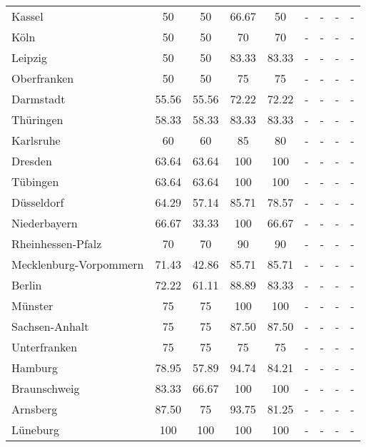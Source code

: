 \begin{table}[H]
\begin{tabularx}{\textwidth}{Xcccccccc}
            Kassel & 50 & 50 & 66.67 & 50 & - & - & - & - \\
            Köln & 50 & 50 & 70 & 70 & - & - & - & - \\
            Leipzig & 50 & 50 & 83.33 & 83.33 & - & - & - & - \\
            Oberfranken & 50 & 50 & 75 & 75 & - & - & - & - \\
            Darmstadt & 55.56 & 55.56 & 72.22 & 72.22 & - & - & - & - \\
            Thüringen & 58.33 & 58.33 & 83.33 & 83.33 & - & - & - & - \\
            Karlsruhe & 60 & 60 & 85 & 80 & - & - & - & - \\
            Dresden & 63.64 & 63.64 & 100 & 100 & - & - & - & - \\
            Tübingen & 63.64 & 63.64 & 100 & 100 & - & - & - & - \\
            Düsseldorf & 64.29 & 57.14 & 85.71 & 78.57 & - & - & - & - \\
            Niederbayern & 66.67 & 33.33 & 100 & 66.67 & - & - & - & - \\
            Rheinhessen-Pfalz & 70 & 70 & 90 & 90 & - & - & - & - \\
            Mecklenburg-Vorpommern & 71.43 & 42.86 & 85.71 & 85.71 & - & - & - & - \\
            Berlin & 72.22 & 61.11 & 88.89 & 83.33 & - & - & - & - \\
            Münster & 75 & 75 & 100 & 100 & - & - & - & - \\
            Sachsen-Anhalt & 75 & 75 & 87.50 & 87.50 & - & - & - & - \\
            Unterfranken & 75 & 75 & 75 & 75 & - & - & - & - \\
            Hamburg & 78.95 & 57.89 & 94.74 & 84.21 & - & - & - & - \\
            Braunschweig & 83.33 & 66.67 & 100 & 100 & - & - & - & - \\
            Arnsberg & 87.50 & 75 & 93.75 & 81.25 & - & - & - & - \\
            Lüneburg & 100 & 100 & 100 & 100 & - & - & - & - \\
            \bottomrule
        \end{tabularx}
    \end{table}
    